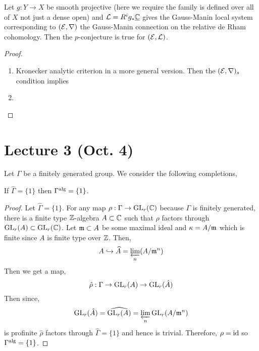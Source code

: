 \documentclass[12pt]{article}
\begin{document}
\begin{theorem}[Katz]
Let $g : Y \to X$ be smooth projective (here we require the family is defined over all of $X$ not just a dense open) and $\mathcal{L} = R^i g_* \underline{\mathbb{C}}$ gives the Gauss-Manin local system corresponding to $(\mathcal{E}, \nabla)$ the Gauss-Manin connection on the relative de Rham cohomology. Then the $p$-conjecture is true for $(\mathcal{E}, \mathcal{L})$. 
\end{theorem}

\begin{proof}
\begin{enumerate}
\item Kronecker analytic criterion in a more general version. Then the $(\mathcal{E}, \nabla)_s$ condition implies 

\item 
\end{enumerate}
\end{proof}

\section{Lecture 3 (Oct. 4)}


Let $\Gamma$ be a finitely generated group. We consider the following completions,
\begin{center}
\end{center}

\begin{theorem}[Mal\v{c}ev, 1940]
If $\widehat{\Gamma} = \{ 1 \}$ then $\Gamma^{\mathrm{alg}} = \{ 1 \}$.
\end{theorem}

\begin{proof}
Let $\widehat{\Gamma} = \{ 1 \}$. For any map $\rho : \Gamma \to \mathrm{GL}_r(\mathbb{C})$ because $\Gamma$ is finitely generated, there is a finite type $\mathbb{Z}$-algebra $A \subset \mathbb{C}$ such that $\rho$ factors through $\mathrm{GL}_r(A) \subset \mathrm{GL}_r(\mathbb{C})$. Let $\mathfrak{m} \subset A$ be some maximal ideal and $\kappa = A / \mathfrak{m}$ which is finite since $A$ is finite type over $\mathbb{Z}$. Then,
\[ A \hookrightarrow \widehat{A} = \varprojlim_n (A / \mathfrak{m}^n) \]
Then we get a map,
\[ \hat{\rho} : \Gamma \to \mathrm{GL}_r(A) \to \mathrm{GL}_r(\hat{A}) \]
Then since,
\[ \mathrm{GL}_r(\hat{A}) = \widehat{\mathrm{GL}_r(A)} = \varprojlim_{n} \mathrm{GL}_r(A/\mathfrak{m}^n) \]
is profinite $\hat{\rho}$ factors through $\widehat{\Gamma} = \{ 1 \}$ and hence is trivial. Therefore, $\rho = \mathrm{id}$ so $\Gamma^{\mathrm{alg}} = \{ 1 \}$.  
\end{proof}
\end{document}
